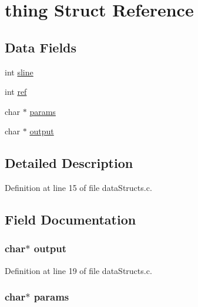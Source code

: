 \hypertarget{structthing}{}\section{thing Struct Reference}
\label{structthing}
\subsection*{Data Fields}
\begin{DoxyCompactItemize}
\item 
int \hyperlink{structthing_a8260a04cd33e11250d7680ccd06af2fc}{sline}
\item 
int \hyperlink{structthing_adb528a1cb1ca190150183394d082590d}{ref}
\item 
char $\ast$ \hyperlink{structthing_a0d119d211b6770402e90c832e7d03767}{params}
\item 
char $\ast$ \hyperlink{structthing_a47866494eb84961e021291efbea9b569}{output}
\end{DoxyCompactItemize}


\subsection{Detailed Description}


Definition at line 15 of file data\+Structs.\+c.



\subsection{Field Documentation}
\subsubsection[{\texorpdfstring{output}{output}}]{\setlength{\rightskip}{0pt plus 5cm}char$\ast$ output}\hypertarget{structthing_a47866494eb84961e021291efbea9b569}{}\label{structthing_a47866494eb84961e021291efbea9b569}


Definition at line 19 of file data\+Structs.\+c.

\subsubsection[{\texorpdfstring{params}{params}}]{\setlength{\rightskip}{0pt plus 5cm}char$\ast$ params}\hypertarget{structthing_a0d119d211b6770402e90c832e7d03767}{}\label{structthing_a0d119d211b6770402e90c832e7d03767}


